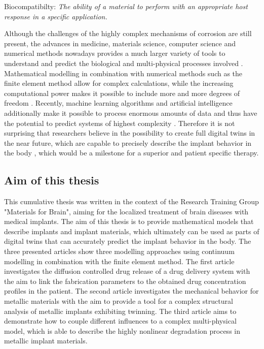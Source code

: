 \begin{center}
  \begin{minipage}{0.9\textwidth}
  Biocompatibilty: 
  \textit{
    The ability of a material to perform with an appropriate host response in a specific application.\\
  }
\end{minipage}
\end{center}
Although the challenges of the highly complex mechanisms of corrosion are still present, the advances in medicine, materials science, computer science and numerical methods nowadays provides a much larger variety of tools to understand and predict the biological and multi-physical processes involved \supercite{wang_biodegradable_2020,prakasam_biodegradable_2017}. Mathematical modelling in combination with numerical methods such as the finite element method allow for complex calculations, while the increasing computational power makes it possible to include more and more degrees of freedom \supercite{menicucci_toothimplant_2002,kladovasilakis_finite_2020,alemayehu_three-dimensional_2021,salaha_biomechanical_2023}. Recently, machine learning algorithms and artificial intelligence additionally make it possible to process enormous amounts of data and thus have the potential to predict systems of highest complexity \supercite{revilla-leon_artificial_2023,suwardi_machine_2022}. Therefore it is not surprising that researchers believe in the possibility to create full digital twins in the near future, which are capable to precisely describe the implant behavior in the body \supercite{cellina_digital_2023,pankaj_patientspecific_2013,erol_digital_2020}, which would be a milestone for a superior and patient specific therapy.  

\subsection{Aim of this thesis}
This cumulative thesis was written in the context of the Research Training Group "Materials for Brain", aiming for the localized treatment of brain diseases with medical implants. The aim of this thesis is to provide mathematical models that describe implants and implant materials, which ultimately can be used as parts of digital twins that can accurately predict the implant behavior in the body. The three presented articles show three modelling approaches using continuum modelling in combination with the finite element method. The first article investigates the diffusion controlled drug release of a drug delivery system with the aim to link the fabrication parameters to the obtained drug concentration profiles in the patient. The second article investigates the mechanical behavior for metallic materials with the aim to provide a tool for a complex structural analysis of metallic implants exhibiting twinning. The third article aims to demonstrate how to couple different influences to a complex multi-physical model, which is able to describe the highly nonlinear degradation process in metallic implant materials.     
